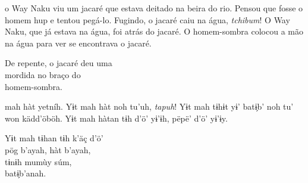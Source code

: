 
 o Way Naku viu um
jacaré que estava deitado
na beira do rio. Pensou
que fosse o homem hup e
tentou pegá-lo. Fugindo,
o jacaré caiu na água,
\textit{tchibum}! O Way Naku,
que já estava na água,
foi atrás do jacaré. O
homem-sombra colocou a
mão na água para ver se
encontrava o jacaré.

\medskip

De repente, o jacaré deu uma\\
mordida no braço do\\
homem-sombra.

\vspace{2em}

 mah hàt yetníh. Yɨt
mah hàt noh tu’uh, \textit{tapuh}!
Yɨt mah tɨhɨt yɨ’ batɨ̗b’ noh
tu’ won kädd’öböh. Yɨt
mah hàtan tɨh d’ö’ yɨ’ɨh,
pëpë’ d’ö’ yɨ’ɨy.

\medskip

Yɨt mah tɨhan tɨh k’äç d’ö’\\
pög b’ayah, hàt b’ayah,\\
tɨnɨh mumùy súm,\\
batɨ̗b’anah.

\vspace*{\fill}

\pagebreak

